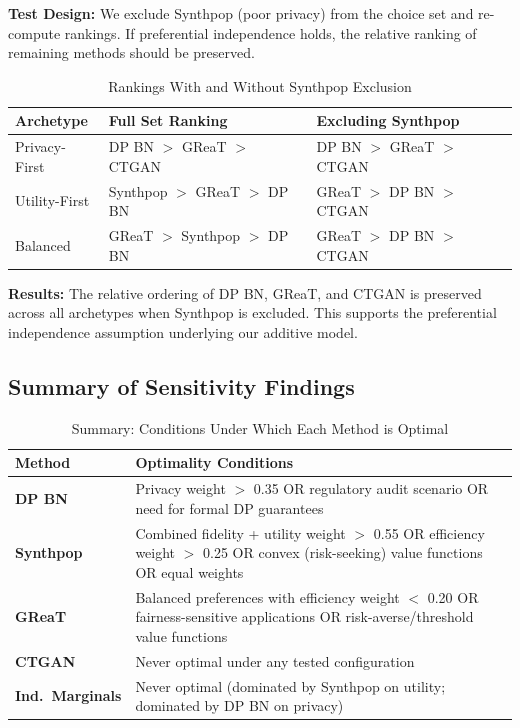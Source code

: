 \documentclass[12pt,a4paper]{article}
\begin{document}
\textbf{Test Design:} We exclude Synthpop (poor privacy) from the choice set and re-compute rankings. If preferential independence holds, the relative ranking of remaining methods should be preserved.

\begin{table}[htbp]
\centering
\caption{Rankings With and Without Synthpop Exclusion}
\label{tab:independence}
\begin{tabular}{@{}lll@{}}
\toprule
\textbf{Archetype} & \textbf{Full Set Ranking} & \textbf{Excluding Synthpop} \\
\midrule
Privacy-First & DP BN $>$ GReaT $>$ CTGAN & DP BN $>$ GReaT $>$ CTGAN \\
Utility-First & Synthpop $>$ GReaT $>$ DP BN & GReaT $>$ DP BN $>$ CTGAN \\
Balanced & GReaT $>$ Synthpop $>$ DP BN & GReaT $>$ DP BN $>$ CTGAN \\
\bottomrule
\end{tabular}
\end{table}

\textbf{Results:} The relative ordering of DP BN, GReaT, and CTGAN is preserved across all archetypes when Synthpop is excluded. This supports the preferential independence assumption underlying our additive model.

\subsection{Summary of Sensitivity Findings}

\begin{table}[htbp]
\centering
\caption{Summary: Conditions Under Which Each Method is Optimal}
\label{tab:sensitivity_summary}
\begin{tabular}{@{}lp{10cm}@{}}
\toprule
\textbf{Method} & \textbf{Optimality Conditions} \\
\midrule
\textbf{DP BN} & Privacy weight $>$ 0.35 OR regulatory audit scenario OR need for formal DP guarantees \\
\textbf{Synthpop} & Combined fidelity + utility weight $>$ 0.55 OR efficiency weight $>$ 0.25 OR convex (risk-seeking) value functions OR equal weights \\
\textbf{GReaT} & Balanced preferences with efficiency weight $<$ 0.20 OR fairness-sensitive applications OR risk-averse/threshold value functions \\
\textbf{CTGAN} & Never optimal under any tested configuration \\
\textbf{Ind.\ Marginals} & Never optimal (dominated by Synthpop on utility; dominated by DP BN on privacy) \\
\bottomrule
\end{tabular}
\end{table}
\end{document}
